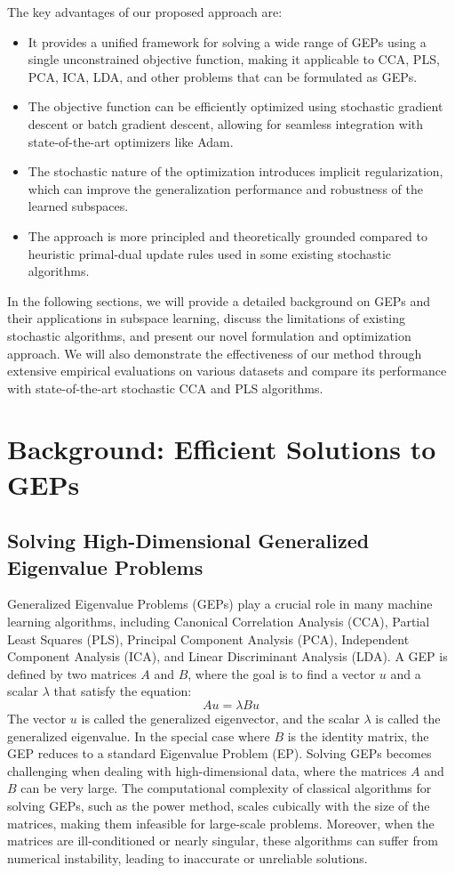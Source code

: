 The key advantages of our proposed approach are:
\begin{itemize}
    \item It provides a unified framework for solving a wide range of GEPs using a single unconstrained objective function, making it applicable to CCA, PLS, PCA, ICA, LDA, and other problems that can be formulated as GEPs.
    \item The objective function can be efficiently optimized using stochastic gradient descent or batch gradient descent, allowing for seamless integration with state-of-the-art optimizers like Adam.
    \item The stochastic nature of the optimization introduces implicit regularization, which can improve the generalization performance and robustness of the learned subspaces.
    \item The approach is more principled and theoretically grounded compared to heuristic primal-dual update rules used in some existing stochastic algorithms.
\end{itemize}

In the following sections, we will provide a detailed background on GEPs and their applications in subspace learning, discuss the limitations of existing stochastic algorithms, and present our novel formulation and optimization approach. We will also demonstrate the effectiveness of our method through extensive empirical evaluations on various datasets and compare its performance with state-of-the-art stochastic CCA and PLS algorithms.

\section{Background: Efficient Solutions to GEPs}\label{sec:background-unified}
\subsection{Solving High-Dimensional Generalized Eigenvalue Problems}
Generalized Eigenvalue Problems (GEPs) play a crucial role in many machine learning algorithms, including Canonical Correlation Analysis (CCA), Partial Least Squares (PLS), Principal Component Analysis (PCA), Independent Component Analysis (ICA), and Linear Discriminant Analysis (LDA). A GEP is defined by two matrices $A$ and $B$, where the goal is to find a vector $u$ and a scalar $\lambda$ that satisfy the equation:
\begin{equation}
Au = \lambda Bu
\end{equation}
The vector $u$ is called the generalized eigenvector, and the scalar $\lambda$ is called the generalized eigenvalue. In the special case where $B$ is the identity matrix, the GEP reduces to a standard Eigenvalue Problem (EP).
Solving GEPs becomes challenging when dealing with high-dimensional data, where the matrices $A$ and $B$ can be very large. The computational complexity of classical algorithms for solving GEPs, such as the power method, scales cubically with the size of the matrices, making them infeasible for large-scale problems. Moreover, when the matrices are ill-conditioned or nearly singular, these algorithms can suffer from numerical instability, leading to inaccurate or unreliable solutions.

